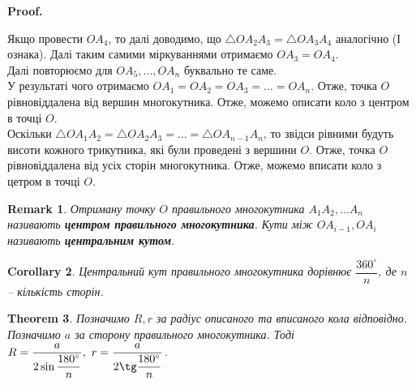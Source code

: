 \documentclass[a4paper, 10pt]{article}
\makeatletter
\theoremstyle{theoremdd}
\newtheorem{theorem}{Theorem}[subsection]
\theoremstyle{theoremdd}
\theoremstyle{theoremdd}
\theoremstyle{theoremdd}
\theoremstyle{theoremdd}
\theoremstyle{theoremdd}
\theoremstyle{theoremdd}
\newtheorem{remark}[theorem]{Remark}
\theoremstyle{theoremdd}
\theoremstyle{theoremdd}
\newtheorem{corollary}[theorem]{Corollary}
\renewenvironment{proof}[1][Proof.\\]{\par
\pushQED{\hfill \qed}%
\normalfont \topsep6\p@\@plus6\p@\relax
\trivlist
\item\relax
{\bfseries
#1\@addpunct{.}}\hspace\labelsep\ignorespaces
}{%
\popQED\endtrivlist\@endpefalse
}
\makeatother
\begin{document}
\begin{proof}
\begin{figure}[H]
\end{figure}
Якщо провести $OA_4$, то далі доводимо, що $\triangle OA_2A_3 = \triangle OA_3A_4$ аналогічно (І ознака). Далі таким самими міркуваннями отримаємо $OA_3 = OA_4$.\\
Далі повторюємо для $OA_5,\dots,OA_n$ буквально те саме.\\
У результаті чого отримаємо $OA_1 = OA_2 = OA_3 = \dots = OA_n$. Отже, точка $O$ рівновіддалена від вершин многокутника. Отже, можемо описати коло з центром в точці $O$.
\bigskip \\
Оскільки $\triangle OA_1A_2 = \triangle OA_2A_3 = \dots = \triangle OA_{n-1}A_n$, то звідси рівними будуть висоти кожного трикутника, які були проведені з вершини $O$. Отже, точка $O$ рівновіддалена від усіх сторін многокутника. Отже, можемо вписати коло з цетром в точці $O$.
\end{proof}

\begin{remark}
Отриману точку $O$ правильного многокутника $A_1A_2,\dots A_n$ називають \textbf{центром правильного многокутника}. Кути між $OA_{i-1}, OA_{i}$ називають \textbf{центральним кутом}.
\end{remark}

\begin{corollary}
Центральний кут правильного многокутника дорівнює $\dfrac{360^\circ}{n}$, де $n$ -- кількість сторін.
\end{corollary}

\begin{theorem}
Позначимо $R,r$ за радіус описаного та вписаного кола відповідно. Позначимо $a$ за сторону правильного многокутника. Тоді $R = \dfrac{a}{2 \sin \dfrac{180^\circ}{n}},\ r = \dfrac{a}{2 \tg \dfrac{180^\circ}{n}}$.
\end{theorem}
\end{document}
